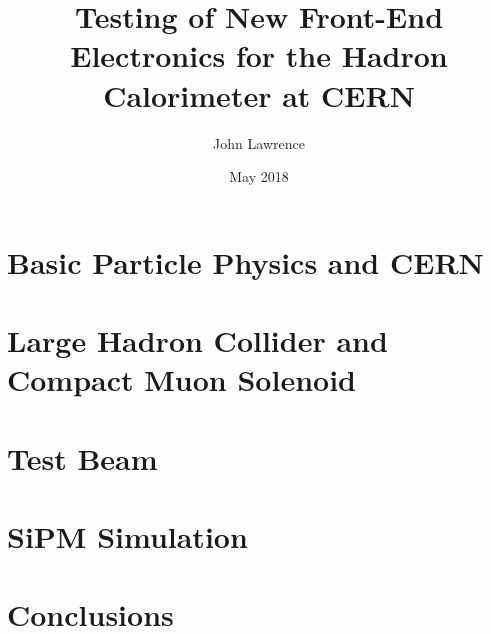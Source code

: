 \documentclass
[]
{thesis}
\title{Testing of New Front-End Electronics for the Hadron Calorimeter at CERN}
\author{John Lawrence}
\date{May 2018}
\begin{document}
	
\chapter{Basic Particle Physics and CERN}
\label{chap:intro}


\chapter{Large Hadron Collider and Compact Muon Solenoid}
\label{chap:LHC_CMS}


\chapter{Test Beam}
\label{chap:test}


\chapter{SiPM Simulation}
\label{chap:sim}


\chapter{Conclusions}
\label{chap:concl}


\begingroup
\raggedright
	
\endgroup
\end{document}
